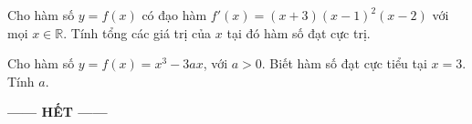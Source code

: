 \documentclass[12pt,a4paper]{article}
\begin{document}
\begin{ex}
	Cho hàm số $y = f(x)$ có đạo hàm $f'(x) = (x + 3)(x - 1)^2(x - 2)$ với mọi $x \in \mathbb{R}$. Tính tổng các giá trị của $x$ tại đó hàm số đạt cực trị.
	\par{}
	\loigiai{}
\end{ex}

\begin{ex}
	Cho hàm số $y = f(x) = x^3 - 3ax$, với $a > 0$. Biết hàm số đạt cực tiểu tại $x = 3$. Tính $a$.
	\par{}
	\loigiai{}
\end{ex}

\vspace{0.4cm}
\begin{center}
	\textbf{------ HẾT ------}
\end{center}
\end{document}
